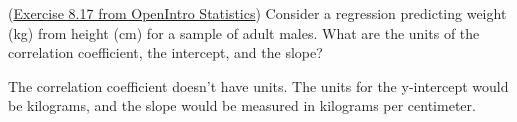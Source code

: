 \documentclass[12pt]{exam}
\begin{document}
\begin{questions}

\question (\href{http://people.hsc.edu/faculty-staff/blins/books/OpenIntroStats4e.pdf\#eoce.8.17}{Exercise 8.17 from OpenIntro Statistics}) Consider a regression predicting weight (kg) from height (cm) for a sample of
adult males. What are the units of the correlation coefficient, the intercept, and the slope?

\begin{solution}
The correlation coefficient doesn't have units.  The units for the y-intercept would be kilograms, and the slope would be measured in kilograms per centimeter. 
\end{solution}
\bigskip



\end{questions}
\end{document}
